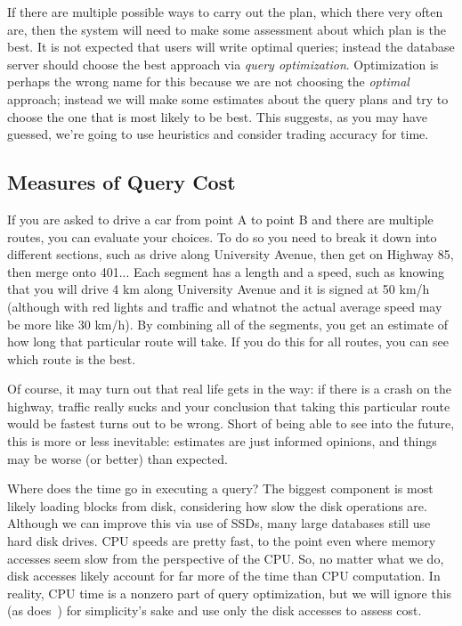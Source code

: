 \documentclass[a4paper]{report}
\begin{document}
If there are multiple possible ways to carry out the plan, which there very often are, then the system will need to make some assessment about which plan is the best. It is not expected that users will write optimal queries; instead the database server should choose the best approach via \textit{query optimization}. Optimization is perhaps the wrong name for this because we are not choosing the \textit{optimal} approach; instead we will make some estimates about the query plans and try to choose the one that is most likely to be best. This suggests, as you may have guessed, we're going to use heuristics and consider trading accuracy for time.

\subsection*{Measures of Query Cost}

If you are asked to drive a car from point A to point B and there are multiple routes, you can evaluate your choices. To do so you need to break it down into different sections, such as drive along University Avenue, then get on Highway 85, then merge onto 401... Each segment has a length and a speed, such as knowing that you will drive 4 km along University Avenue and it is signed at 50 km/h (although with red lights and traffic and whatnot the actual average speed may be more like 30 km/h). By combining all of the segments, you get an estimate of how long that particular route will take. If you do this for all routes, you can see which route is the best. 

Of course, it may turn out that real life gets in the way: if there is a crash on the highway, traffic really sucks and your conclusion that taking this particular route would be fastest turns out to be wrong. Short of being able to see into the future, this is more or less inevitable: estimates are just informed opinions, and things may be worse (or better) than expected. 

Where does the time go in executing a query? The biggest component is most likely loading blocks from disk, considering how slow the disk operations are. Although we can improve this via use of SSDs, many large databases still use hard disk drives. CPU speeds are pretty fast, to the point even where memory accesses seem slow from the perspective of the CPU. So, no matter what we do, disk accesses likely account for far more of the time than CPU computation. In reality, CPU time is a nonzero part of query optimization, but we will ignore this (as does~\cite{dsc}) for simplicity's sake and use only the disk accesses to assess cost.
\end{document}
